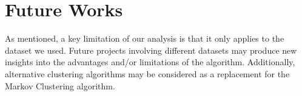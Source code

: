 \section{Future Works}
As mentioned, a key limitation of our analysis is that it only applies to the dataset we used. Future projects involving different datasets may produce new insights into the advantages and/or limitations of the algorithm. Additionally, alternative clustering algorithms may be considered as a replacement for the Markov Clustering algorithm. 
